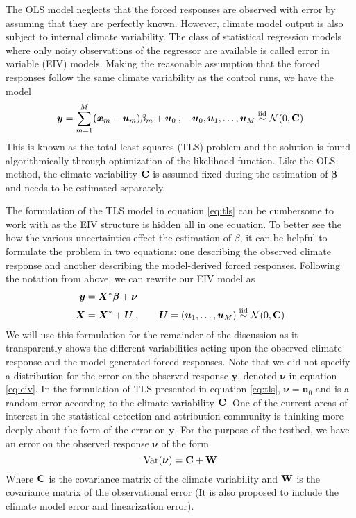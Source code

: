 \documentclass[11pt]{article}
\newcommand{\V}{\ensuremath{\text{Var}}}
\newcommand{\C}{\ensuremath{\text{Cov}}}
\def\*#1{\bm{#1}}
\def\C{\textbf{\text{C}}}
\def\W{\textbf{\text{W}}}
\begin{document}
The OLS model neglects that the forced responses are observed with error by assuming that they are perfectly known. However, climate model output is also subject to internal climate variability. The class of statistical regression models where only noisy observations of the regressor are available is called error in variable (EIV) models.  Making the reasonable assumption that the forced responses follow the same climate variability as the control runs, we have the model
\begin{equation} \label{eq:tls}
\*y = \sum_{m=1}^M \*(\*x_m - \*u_m) \beta_m + \*u_0\: , \quad \*u_0,\*u_1,\dots,\*u_M \stackrel{\text{iid}}{\sim} \mathcal{N}(0,\C)
\end{equation}
This is known as the total least squares (TLS) problem and the solution is found algorithmically through optimization of the likelihood function. Like the OLS method, the climate variability $\C$ is assumed fixed during the estimation of $\*\beta$ and needs to be estimated separately. 

The formulation of the TLS model in equation \ref{eq:tls} can be cumbersome to work with as the EIV structure is hidden all in one equation. To better see the how the various uncertainties effect the estimation of $\beta$, it can be helpful to formulate the problem in two equations: one describing the observed climate response and another describing the model-derived forced responses. Following the notation from above, we can rewrite our EIV model as
\begin{align} \label{eq:eiv}
\*y &= \*X^* \*\beta + \*\nu \nonumber \\
\*X &= \*X^* + \*U \: , \qquad \*U = (\*u_1, \dots, \*u_M) \stackrel{\text{iid}}{\sim} \mathcal{N}(0,\C)
\end{align}
We will use this formulation for the remainder of the discussion as it transparently shows the different variabilities acting upon the observed climate response and the model generated forced responses. Note that we did not specify a distribution for the error on the observed response $\*y$, denoted $\*\nu$ in equation \ref{eq:eiv}. In the formulation of TLS presented in equation \ref{eq:tls}, $\*\nu = \*u_0$ and is a random error according to the climate variability $\C$. One of the current areas of interest in the statistical detection and attribution community is thinking more deeply about the form of the error on $\*y$. For the purpose of the testbed, we have an error on the observed response $\*\nu$ of the form
\[
\V(\*\nu) = \C + \W
\]
Where $\C$ is the covariance matrix of the climate variability and $\W$ is the covariance matrix of the observational error (It is also proposed to include the climate model error and linearization error).
\end{document}
